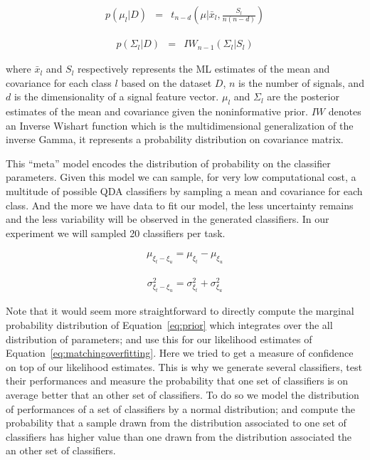 \begin{eqnarray}
p(\mu_l|D) & = & t_{n-d}(\mu| \bar{x}_l, \frac{S_l}{n(n-d)})
\label{eq:jeffreysmean}
\end{eqnarray}

\begin{eqnarray}
p(\Sigma_l|D) & = & IW_{n-1}(\Sigma_l | S_l)
\label{eq:jeffreyscov}
\end{eqnarray}

where $\bar{x}_l$ and $S_l$ respectively represents the ML estimates of the mean and covariance for each class $l$ based on the dataset $D$, $n$ is the number of signals, and $d$ is the dimensionality of a signal feature vector.
$\mu_l$ and $\Sigma_l$ are the posterior estimates of the mean and covariance given the noninformative prior. $IW$ denotes an Inverse Wishart function which is the multidimensional generalization of the inverse Gamma, it represents a probability distribution on covariance matrix.

This ``meta'' model encodes the distribution of probability on the classifier parameters. Given this model we can sample, for very low computational cost, a multitude of possible QDA classifiers by sampling a mean and covariance for each class. And the more we have data to fit our model, the less uncertainty remains and the less variability will be observed in the generated classifiers. In our experiment we will sampled 20 classifiers per task.


\begin{eqnarray}
\mu_{\xi_t - \xi_u} = \mu_{\xi_t} - \mu_{\xi_u} 
\label{eq:meandiffgaussian}
\end{eqnarray}

\begin{eqnarray}
\sigma^2_{\xi_t - \xi_u} = \sigma^2_{\xi_t} + \sigma^2_{\xi_u}
\label{eq:variancediffgaussian}
\end{eqnarray}

Note that it would seem more straightforward to directly compute the marginal probability distribution of Equation~\ref{eq:prior} which integrates over the all distribution of parameters; and use this for our likelihood estimates of Equation~\ref{eq:matchingoverfitting}. Here we tried to get a measure of confidence on top of our likelihood estimates. This is why we generate several classifiers, test their performances and measure the probability that one set of classifiers is on average better that an other set of classifiers. To do so we model the distribution of performances of a set of classifiers by a normal distribution; and compute the probability that a sample drawn from the distribution associated to one set of classifiers has higher value than one drawn from the distribution associated the an other set of classifiers.

